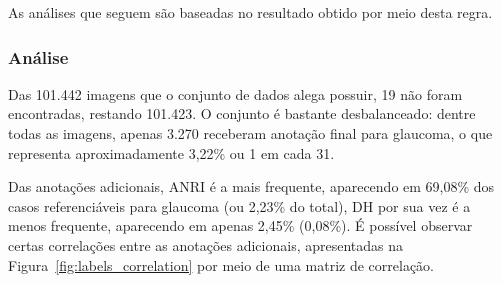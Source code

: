 \documentclass[12pt]{article}
\begin{document}

As análises que seguem são baseadas no resultado obtido por meio desta regra.

\subsubsection{Análise}
\label{sec:dataset:analysis}
Das 101.442 imagens que o conjunto de dados alega possuir, 19 não foram encontradas, restando 101.423. O conjunto é bastante desbalanceado: dentre todas as imagens, apenas 3.270 receberam anotação final para glaucoma, o que representa aproximadamente 3,22\% ou 1 em cada 31.

Das anotações adicionais, ANRI é a mais frequente, aparecendo em 69,08\% dos casos referenciáveis para glaucoma (ou 2,23\% do total), DH por sua vez é a menos frequente, aparecendo em apenas 2,45\% (0,08\%). 
É possível observar certas correlações entre as anotações adicionais, apresentadas na Figura~\ref{fig:labels_correlation} por meio de uma matriz de correlação.

\end{document}
